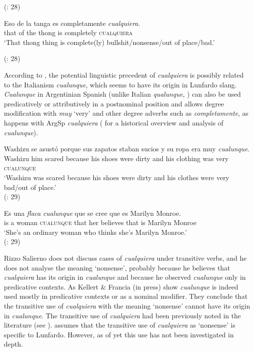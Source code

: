     (\citealt{Rizzosalierno2013}: 28)
\z

\ea \label{ex:key:188} %
    \gll Eso de la tanga es completamente \textit{cualquiera}.\\
    that of the thong is completely \textsc{cualquiera}\\
    \glt ‘That thong thing is complete(ly) bullshit/nonsense/out of place/bad.’

    (\citealt{Rizzosalierno2013}: 28)
\z

According to \citet{Rizzosalierno2013}, the potential linguistic precedent of \textit{cualquiera} is possibly related to the Italianism \textit{cualunque}, which seems to have its origin in Lunfardo slang. \textit{Cualunque} in Argentinian Spanish (unlike Italian \textit{qualunque}, \citealt{Kellert2021a}) can also be used predicatively or attributively in a postnominal position and allows degree modification with \textit{muy} ‘very’ and other degree adverbs such as \textit{completamente}, as happens with ArgSp \textit{cualquiera} (\citealt{Kellert-francia-2023} for a historical overview and analysis of \textit{cualunque}).

\ea \label{ex:key:189-1} %
\gll Washizu se asustó porque sus zapatos staban sucios y su ropa era muy \textit{cualunque}.\\
    Washizu him scared because his shoes were dirty and his clothing was very \textsc{cualunque}\\
\glt ‘Washizu was scared because his shoes were dirty and his clothes were very {bad/out of place.}’\\
    (\citealt{Rizzosalierno2013}: 29)
\z


\ea \label{ex:key:190} %
    \gll Es una \textit{flaca} \textit{cualunque} que se cree que es Marilyn Monroe.\\
    is a woman \textsc{cualunque} that her believes that is Marilyn Monroe\\
    \glt ‘She’s an ordinary woman who thinks she’s Marilyn Monroe.’\\
    (\citealt{Rizzosalierno2013}: 29)
\z


Rizzo Salierno does not discuss cases of \textit{cualquiera} under transitive verbs, and he does not analyse the meaning ‘nonsense’, probably because he believes that \textit{cualquiera} has its origin in \textit{cualunque} and because he observed \textit{cualunque} only in predicative contexts. As Kellert \& Francia (in press) show \textit{cualunque} is indeed used mostly in predicative contexts or as a nominal modifier. They conclude that the transitive use of \textit{cualquiera} with the meaning ‘nonsense’ cannot have its origin in \textit{cualunque}. The transitive use of \textit{cualquiera} had been previously noted in the literature (see ). \citet{Conde2011} assumes that the transitive use of \textit{cualquiera} as ‘nonsense’ is specific to Lunfardo. However, as of yet this use has not been investigated in depth.


